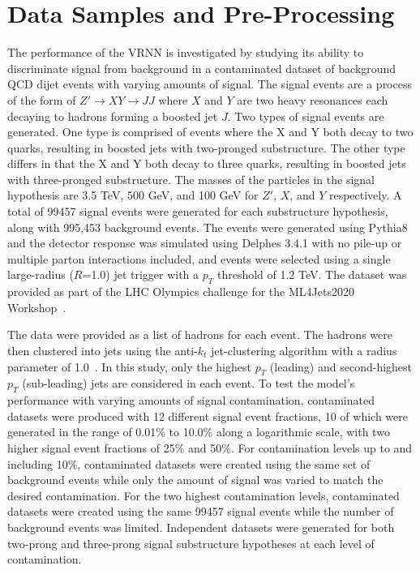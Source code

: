 \documentclass[11pt, a4paper]{article}
\begin{document}

\section{Data Samples and Pre-Processing}


The performance of the VRNN is investigated by studying its ability to discriminate signal from background in a contaminated dataset of background QCD dijet events with varying amounts of signal. The signal events are a process of the form of $Z'\rightarrow XY \rightarrow JJ$ where $X$ and $Y$ are two heavy resonances each decaying to hadrons forming a boosted jet $J$. Two types of signal events are generated. One type is comprised of events where the X and Y both decay to two quarks, resulting in boosted jets with two-pronged substructure. The other type differs in that the X and Y both decay to three quarks, resulting in boosted jets with three-pronged substructure. The masses of the particles in the signal hypothesis are 3.5 TeV, 500 GeV, and 100 GeV for $Z'$, $X$, and $Y$ respectively. A total of 99457 signal events were generated for each substructure hypothesis, along with 995,453 background events. The events were generated using {\sc Pythia8} and the detector response was simulated using {\sc Delphes 3.4.1} with no pile-up or multiple parton interactions included, and events were selected using a single large-radius ($R$=1.0) jet trigger with a $p_T$ threshold of 1.2 TeV. The dataset was provided as part of the LHC Olympics challenge for the ML4Jets2020 Workshop~\cite{dataset}. 

The data were provided as a list of hadrons for each event. The hadrons were then clustered into jets using the anti-$k_{t}$ jet-clustering algorithm with a radius parameter of 1.0~\cite{Cacciari_2008}. In this study, only the highest $p_{T}$ (leading) and second-highest $p_{T}$ (sub-leading) jets are considered in each event. To test the model's performance with varying amounts of signal contamination, contaminated datasets were produced with 12 different signal event fractions, 10 of which were generated in the range of 0.01\% to 10.0\% along a logarithmic scale, with two higher signal event fractions of 25\% and 50\%. For contamination levels up to and including 10\%, contaminated datasets were created using the same set of background events while only the amount of signal was varied to match the desired contamination. For the two highest contamination levels, contaminated datasets were created using the same 99457 signal events while the number of background events was limited. 
Independent datasets were generated for both two-prong and three-prong signal substructure hypotheses at each level of contamination.
\end{document}
